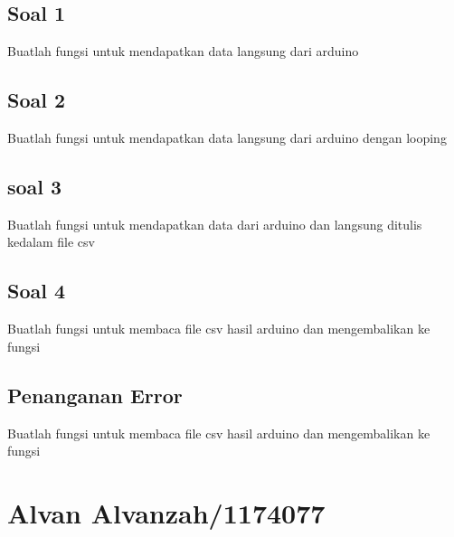 \subsection{Soal 1}
Buatlah fungsi untuk mendapatkan data langsung dari arduino


\subsection{Soal 2}
Buatlah fungsi untuk mendapatkan data langsung dari arduino dengan looping


\subsection{soal 3}
Buatlah fungsi untuk mendapatkan data dari arduino dan langsung ditulis kedalam file csv


\subsection{Soal 4}
Buatlah fungsi untuk membaca file csv hasil arduino dan mengembalikan ke fungsi


\subsection{Penanganan Error}
Buatlah fungsi untuk membaca file csv hasil arduino dan mengembalikan ke fungsi


\section{Alvan Alvanzah/1174077}
